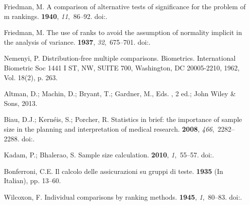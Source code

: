 \documentclass[entropy,article,submit,moreauthors,pdftex]{Definitions/mdpi}
\begin{document}
\begin{thebibliography}{-------}
Friedman, M.
\newblock A comparison of alternative tests of significance for the problem of
  m rankings.
 {\bf 1940}, {\em 11},~86--92.
\newblock
  doi:{\href{https://doi.org/10.1214/aoms/1177731944}{}}.

Friedman, M.
\newblock The use of ranks to avoid the assumption of normality implicit in the
  analysis of variance.
 {\bf 1937}, {\em 32},~675--701.
\newblock
  doi:{\href{https://doi.org/10.1080/01621459.1937.10503522}{}}.

Nemenyi, P.
\newblock Distribution-free multiple comparisons.
\newblock  Biometrics. International Biometric Soc 1441 I ST, NW, SUITE 700,
  Washington, DC 20005-2210,  1962, Vol. 18(2), p. 263.

Altman, D.; Machin, D.; Bryant, T.; Gardner, M., Eds.
, 2 ed.; John Wiley \& Sons,  2013.

Biau, D.J.; Kern{\'e}is, S.; Porcher, R.
\newblock Statistics in brief: the importance of sample size in the planning
  and interpretation of medical research.
 {\bf 2008}, {\em 466},~2282--2288.
\newblock
  doi:{\href{https://doi.org/10.1007/s11999-008-0346-9}{}}.

Kadam, P.; Bhalerao, S.
\newblock Sample size calculation.
 {\bf 2010}, {\em 1},~55--57.
\newblock
  doi:{\href{https://doi.org/10.4103/0974-7788.59946}{}}.

Bonferroni, C.E.
\newblock Il calcolo delle assicurazioni su gruppi di teste.
 {\bf
  1935} (In Italian), pp. 13--60.

Wilcoxon, F.
\newblock Individual comparisons by ranking methods.
 {\bf 1945}, {\em 1},~80--83.
\newblock
  doi:{\href{https://doi.org/10.2307/3001968}{}}.


\end{thebibliography}
\end{document}
